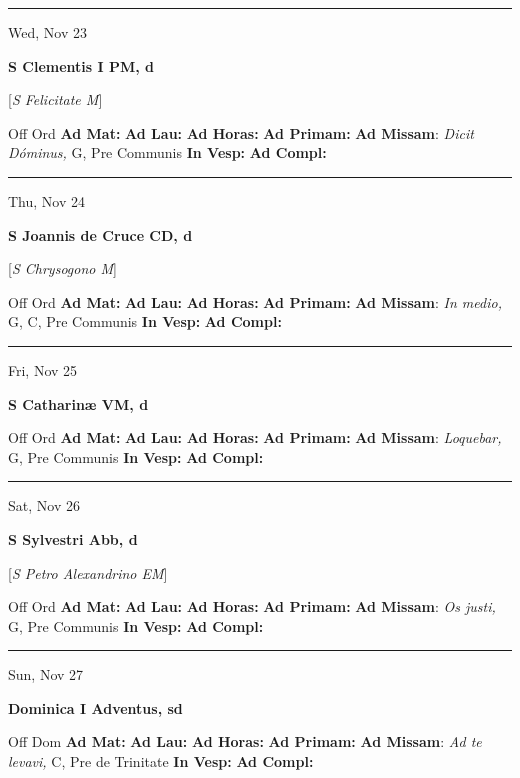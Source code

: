 \documentclass[letterpaper, 10pt]{article}
\begin{document}
\hrule
\begin{center}
Wed, Nov 23
\end{center}\textbf{ \large S Clementis I PM, \textnormal{\normalsize d}}

[\textit{S Felicitate M}]
\begin{justify}
Off Ord
\textbf{Ad Mat: }
\textbf{Ad Lau: }
\textbf{Ad Horas: }
\textbf{Ad Primam: }
\textbf{Ad Missam}: \textit{Dicit Dóminus,} G, Pre Communis
\textbf{In Vesp: }
\textbf{Ad Compl: }\end{justify}



\hrule
\begin{center}
Thu, Nov 24
\end{center}\textbf{ \large S Joannis de Cruce CD, \textnormal{\normalsize d}}

[\textit{S Chrysogono M}]
\begin{justify}
Off Ord
\textbf{Ad Mat: }
\textbf{Ad Lau: }
\textbf{Ad Horas: }
\textbf{Ad Primam: }
\textbf{Ad Missam}: \textit{In medio,} G, C, Pre Communis
\textbf{In Vesp: }
\textbf{Ad Compl: }\end{justify}



\hrule
\begin{center}
Fri, Nov 25
\end{center}\textbf{ \large S Catharinæ VM, \textnormal{\normalsize d}}
\begin{justify}
Off Ord
\textbf{Ad Mat: }
\textbf{Ad Lau: }
\textbf{Ad Horas: }
\textbf{Ad Primam: }
\textbf{Ad Missam}: \textit{Loquebar,} G, Pre Communis
\textbf{In Vesp: }
\textbf{Ad Compl: }\end{justify}



\hrule
\begin{center}
Sat, Nov 26
\end{center}\textbf{ \large S Sylvestri Abb, \textnormal{\normalsize d}}

[\textit{S Petro Alexandrino EM}]
\begin{justify}
Off Ord
\textbf{Ad Mat: }
\textbf{Ad Lau: }
\textbf{Ad Horas: }
\textbf{Ad Primam: }
\textbf{Ad Missam}: \textit{Os justi,} G, Pre Communis
\textbf{In Vesp: }
\textbf{Ad Compl: }\end{justify}



\hrule
\begin{center}
Sun, Nov 27
\end{center}\textbf{ \large Dominica I Adventus, \textnormal{\normalsize sd}}
\begin{justify}
Off Dom
\textbf{Ad Mat: }
\textbf{Ad Lau: }
\textbf{Ad Horas: }
\textbf{Ad Primam: }
\textbf{Ad Missam}: \textit{Ad te levavi,} C, Pre de Trinitate
\textbf{In Vesp: }
\textbf{Ad Compl: }\end{justify}
\end{document}

